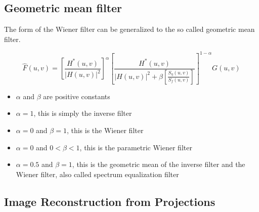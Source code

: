 \subsection{Geometric mean filter }
The form of the Wiener filter can be generalized to the so called geometric mean filter.

\begin{equation}
	\hat{F}(u,v) =  \left[ \frac{H^*(u,v)}{|H(u,v)|^2} \right]^{\alpha}  \left[ \frac{H^*(u,v)}{|H(u,v)|^2 + \beta \left[ \frac{S_\eta(u,v)}{S_f(u,v)}\right]} \right]^{1-\alpha} G(u,v)
\end{equation}

\begin{itemize}
	\item $\alpha$ and $\beta$ are positive constants
	\item $\alpha = 1$, this is simply the inverse filter
	\item $\alpha=0$ and $\beta=1$, this is the Wiener filter
	\item $\alpha=0$ and $0 < \beta < 1$, this is the parametric Wiener filter
	\item $\alpha=0.5$ and $\beta=1$, this is the geometric mean of the inverse filter and the Wiener filter, also called spectrum equalization filter
\end{itemize}

\subsection{Image Reconstruction from Projections }

